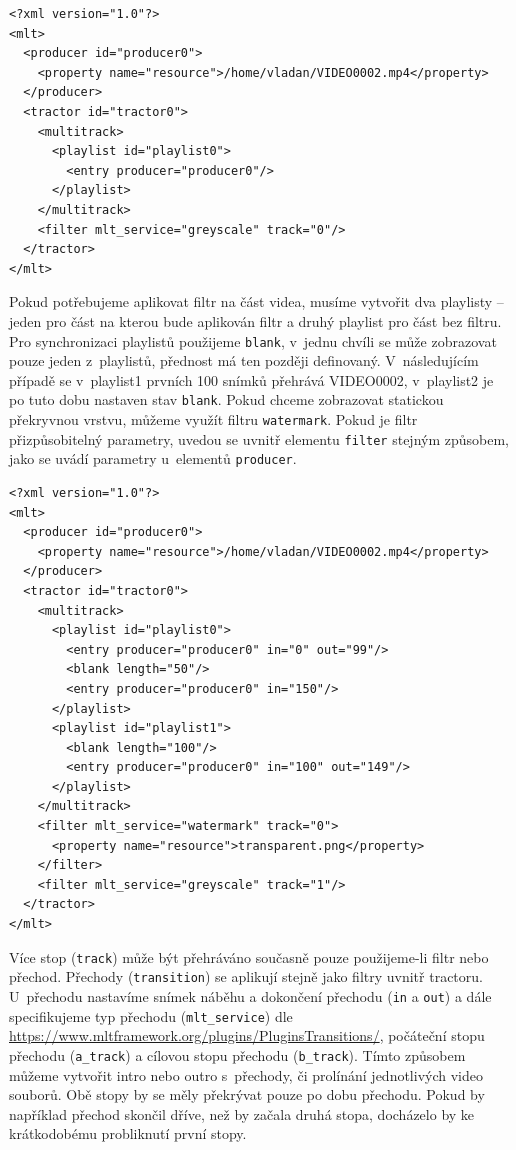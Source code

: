 \begin{lstlisting}[style=xml]
<?xml version="1.0"?>
<mlt>
  <producer id="producer0">
    <property name="resource">/home/vladan/VIDEO0002.mp4</property>
  </producer>
  <tractor id="tractor0">
    <multitrack>
      <playlist id="playlist0">
        <entry producer="producer0"/>
      </playlist>
    </multitrack>
    <filter mlt_service="greyscale" track="0"/>
  </tractor>
</mlt>
\end{lstlisting}
Pokud potřebujeme aplikovat filtr na část videa, musíme vytvořit dva playlisty -- jeden pro část na kterou bude aplikován filtr a druhý playlist pro část bez filtru. Pro synchronizaci playlistů použijeme \texttt{blank}, v~jednu chvíli se může zobrazovat pouze jeden z~playlistů, přednost má ten později definovaný. V~následujícím případě se v~playlist1 prvních 100 snímků přehrává VIDEO0002, v~playlist2 je po tuto dobu nastaven stav \texttt{blank}. Pokud chceme zobrazovat statickou překryvnou vrstvu, můžeme využít filtru \texttt{watermark}. Pokud je filtr přizpůsobitelný parametry, uvedou se uvnitř elementu \texttt{filter} stejným způsobem, jako se uvádí parametry u~elementů \texttt{producer}.
\begin{lstlisting}[style=xml]
<?xml version="1.0"?>
<mlt>
  <producer id="producer0">
    <property name="resource">/home/vladan/VIDEO0002.mp4</property>
  </producer>
  <tractor id="tractor0">
    <multitrack>
      <playlist id="playlist0">
        <entry producer="producer0" in="0" out="99"/>
        <blank length="50"/>
        <entry producer="producer0" in="150"/>
      </playlist>
      <playlist id="playlist1">
        <blank length="100"/>
        <entry producer="producer0" in="100" out="149"/>
      </playlist>
    </multitrack>
    <filter mlt_service="watermark" track="0">
      <property name="resource">transparent.png</property>
    </filter>
    <filter mlt_service="greyscale" track="1"/>
  </tractor>
</mlt>
\end{lstlisting}
Více stop (\texttt{track}) může být přehráváno současně pouze použijeme-li filtr nebo přechod. Přechody (\texttt{transition}) se aplikují stejně jako filtry uvnitř tractoru. U~přechodu nastavíme snímek náběhu a dokončení přechodu (\texttt{in} a \texttt{out}) a dále specifikujeme typ přechodu (\texttt{mlt\_service}) dle \url{https://www.mltframework.org/plugins/PluginsTransitions/}, počáteční stopu přechodu (\texttt{a\_track}) a cílovou stopu přechodu (\texttt{b\_track}). Tímto způsobem můžeme vytvořit intro nebo outro s~přechody, či prolínání jednotlivých video souborů. Obě stopy by se měly překrývat pouze po dobu přechodu. Pokud by například přechod skončil dříve, než by začala druhá stopa, docházelo by ke krátkodobému probliknutí první stopy.
